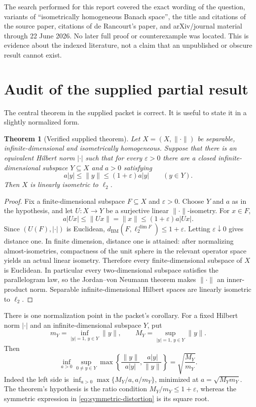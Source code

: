 \documentclass[11pt]{article}
\newtheorem{theorem}{Theorem}[section]
\theoremstyle{definition}
\begin{document}
The search performed for this report covered the exact wording of the
question, variants of ``isometrically homogeneous Banach space'', the title
and citations of the source paper, citations of de Rancourt's paper, and
arXiv/journal material through 22 June 2026.  No later full proof or
counterexample was located.  This is evidence about the indexed literature,
not a claim that an unpublished or obscure result cannot exist.

\section{Audit of the supplied partial result}\label{sec:audit}

The central theorem in the supplied packet is correct.  It is useful to state
it in a slightly normalized form.

\begin{theorem}[Verified supplied theorem]\label{thm:supplied}
Let $X=(X,\|\cdot\|)$ be separable, infinite-dimensional and isometrically
homogeneous.  Suppose that there is an equivalent Hilbert norm $|\cdot|$ such
that for every $\varepsilon>0$ there are a closed infinite-dimensional
subspace $Y\subseteq X$ and $a>0$ satisfying
\[
 a|y|\leq \|y\|\leq (1+\varepsilon)a|y|
 \qquad(y\in Y).
\]
Then $X$ is linearly isometric to $\ell_2$.
\end{theorem}

\begin{proof}
Fix a finite-dimensional subspace $F\subseteq X$ and $\varepsilon>0$.  Choose
$Y$ and $a$ as in the hypothesis, and let $U:X\to Y$ be a surjective linear
$\|\cdot\|$-isometry.  For $x\in F$,
\[
 a|Ux|\leq \|Ux\|=\|x\|\leq(1+\varepsilon)a|Ux|.
\]
Since $(U(F),|\cdot|)$ is Euclidean,
$d_{\mathrm{BM}}(F,\ell_2^{\dim F})\leq1+\varepsilon$.  Letting
$\varepsilon\downarrow0$ gives distance one.  In finite dimension, distance
one is attained: after normalizing almost-isometries, compactness of the unit
sphere in the relevant operator space yields an actual linear isometry.
Therefore every finite-dimensional subspace of $X$ is Euclidean.  In
particular every two-dimensional subspace satisfies the parallelogram law, so
the Jordan--von Neumann theorem makes $\|\cdot\|$ an inner-product norm.
Separable infinite-dimensional Hilbert spaces are linearly isometric to
$\ell_2$.
\end{proof}

There is one normalization point in the packet's corollary.  For a fixed
Hilbert norm $|\cdot|$ and an infinite-dimensional subspace $Y$, put
\[
 m_Y=\inf_{|y|=1,\,y\in Y}\|y\|,
 \qquad
 M_Y=\sup_{|y|=1,\,y\in Y}\|y\|.
\]
Then
\begin{equation}\label{eq:symmetric-distortion}
 \inf_{a>0}\sup_{0\ne y\in Y}
 \max\left\{\frac{\|y\|}{a|y|},\frac{a|y|}{\|y\|}\right\}
 =\sqrt{\frac{M_Y}{m_Y}}.
\end{equation}
Indeed the left side is $\inf_{a>0}\max\{M_Y/a,a/m_Y\}$, minimized at
$a=\sqrt{M_Ym_Y}$.  The theorem's hypothesis is the ratio condition
$M_Y/m_Y\leq1+\varepsilon$, whereas the symmetric expression in
\eqref{eq:symmetric-distortion} is its square root.
\end{document}
